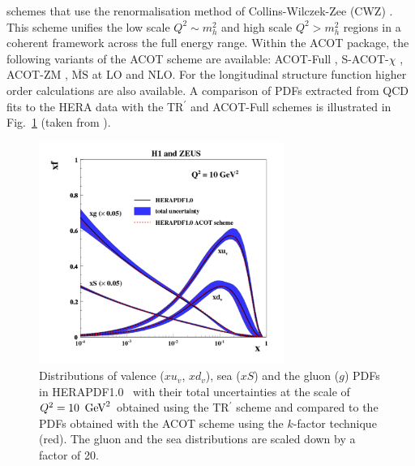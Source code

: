 \begin{itemize}
schemes that use the renormalisation method of Collins-Wilczek-Zee (CWZ) \cite{CWZ}.
This scheme unifies the low scale $Q^2 \sim m_h^2$ and high scale $Q^2 > m_h^2$ regions
in a coherent framework across the full energy range.
%
Within the ACOT package, the following variants of the ACOT scheme are available:
ACOT-Full \cite{Aivazis:1993pi}, S-ACOT-$\chi$ \cite{Kramer:2000hn,Kretzer:2003it}, ACOT-ZM \cite{Aivazis:1993pi}, 
$\overline{\text{MS}}$ at LO and NLO. 
For the longitudinal structure function higher order calculations are also available. 
A comparison of PDFs extracted from QCD fits to the HERA data 
with the TR$^\prime$ and ACOT-Full schemes is illustrated in Fig.~\ref{fig:acotrt} (taken from \cite{h1zeus:2009wt}).

\begin{figure}[!ht]
\centering
\includegraphics[width=8cm]{heraacot}
   \caption{Distributions of valence ($xu_v$, $xd_v$), sea ($xS$) and the gluon ($g$) PDFs in HERAPDF1.0~\cite{h1zeus:2009wt}
       with their total uncertainties at the scale of $Q^2 = 10\ \,\text{Ge\hspace{-.08em}V}^2$ obtained 
       using the TR$^\prime$ scheme and compared to the PDFs obtained with 
       the ACOT scheme using the $k$-factor technique (red).
       The gluon and the sea distributions are scaled down by a factor of 20.}
 \label{fig:acotrt}
\end{figure}


\end{itemize}

